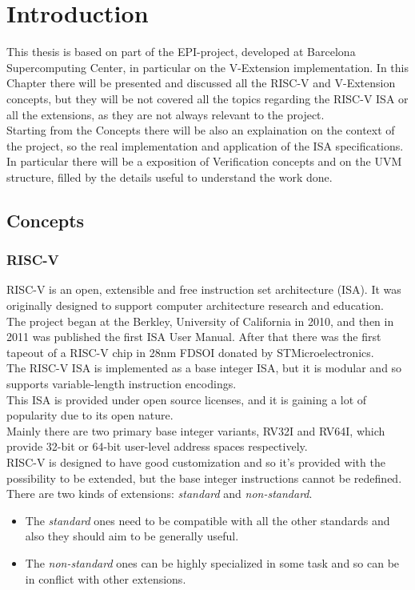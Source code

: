 \chapter{Introduction}
This thesis is based on part of the EPI-project, developed at Barcelona Supercomputing Center, in particular on the V-Extension implementation.
In this Chapter there will be presented and discussed all the RISC-V and V-Extension concepts, but they will be not covered all the topics regarding the RISC-V ISA or all the extensions, as they are not always relevant to the project.\\
Starting from the Concepts there will be also an explaination on the context of the project, so the real implementation and application of the ISA specifications.
In particular there will be a exposition of Verification concepts and on the UVM structure, filled by the details useful to understand the work done.



\section{Concepts}
\subsection{RISC-V}
RISC-V is an open, extensible and free instruction set architecture (ISA). It was originally designed to support computer architecture research and education\cite{RISC-V-Instruction-Set-Manual}.\\
The project began at the Berkley, University of California in 2010, and then in 2011 was published the first ISA User Manual. After that there was the first tapeout of a RISC-V chip in 28nm FDSOI donated by STMicroelectronics.\\

The RISC-V ISA is implemented as a base integer ISA, but it is modular and so supports  variable-length instruction encodings.\\
This ISA is provided under open source licenses, and it is gaining a lot of popularity due to its open nature. \\
Mainly there are two primary base integer variants, RV32I and RV64I, which provide 32-bit or 64-bit user-level address spaces respectively.\\

RISC-V is designed to have good customization and so it's provided with the possibility to be extended, but the base integer instructions cannot be redeﬁned.\\
There are two kinds of extensions:
\textit{standard} and \textit{non-standard}.
\begin{itemize}
    \item The \textit{standard} ones need to be compatible with all the other standards and also they should aim to be generally useful.
    \item The \textit{non-standard} ones can be highly specialized in some task and so can be in conflict with other extensions.
\end{itemize}

